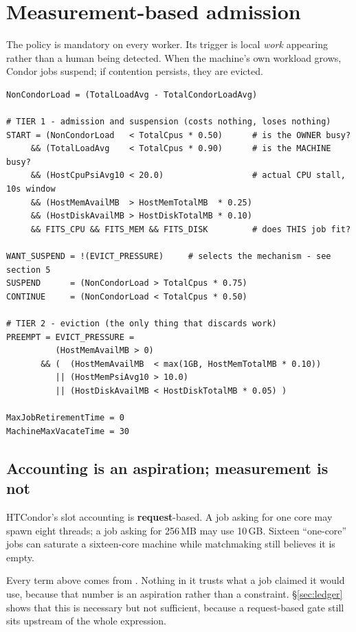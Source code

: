 \section{Measurement-based admission}
\label{sec:admission}

The policy is mandatory on every worker. Its trigger is local \emph{work}
appearing rather than a human being detected. When the machine's own workload
grows, Condor jobs suspend; if contention persists, they are evicted.

\begin{lstlisting}
NonCondorLoad = (TotalLoadAvg - TotalCondorLoadAvg)

# TIER 1 - admission and suspension (costs nothing, loses nothing)
START = (NonCondorLoad   < TotalCpus * 0.50)      # is the OWNER busy?
     && (TotalLoadAvg    < TotalCpus * 0.90)      # is the MACHINE busy?
     && (HostCpuPsiAvg10 < 20.0)                  # actual CPU stall, 10s window
     && (HostMemAvailMB  > HostMemTotalMB  * 0.25)
     && (HostDiskAvailMB > HostDiskTotalMB * 0.10)
     && FITS_CPU && FITS_MEM && FITS_DISK         # does THIS job fit?

WANT_SUSPEND = !(EVICT_PRESSURE)     # selects the mechanism - see section 5
SUSPEND      = (NonCondorLoad > TotalCpus * 0.75)
CONTINUE     = (NonCondorLoad < TotalCpus * 0.50)

# TIER 2 - eviction (the only thing that discards work)
PREEMPT = EVICT_PRESSURE =
          (HostMemAvailMB > 0)
       && (  (HostMemAvailMB  < max(1GB, HostMemTotalMB * 0.10))
          || (HostMemPsiAvg10 > 10.0)
          || (HostDiskAvailMB < HostDiskTotalMB * 0.05) )

MaxJobRetirementTime = 0
MachineMaxVacateTime = 30
\end{lstlisting}

\subsection{Accounting is an aspiration; measurement is not}

\begin{keypoint}
HTCondor's slot accounting is \textbf{request}-based. A job asking for one core
may spawn eight threads; a job asking for 256\,MB may use 10\,GB. Sixteen
``one-core'' jobs can saturate a sixteen-core machine while matchmaking still
believes it is empty.
\end{keypoint}

Every term above comes from . Nothing in it trusts what a job
claimed it would use, because that number is an aspiration rather than a
constraint. \S\ref{sec:ledger} shows that this is necessary but not sufficient,
because a request-based gate still sits upstream of the whole expression.

